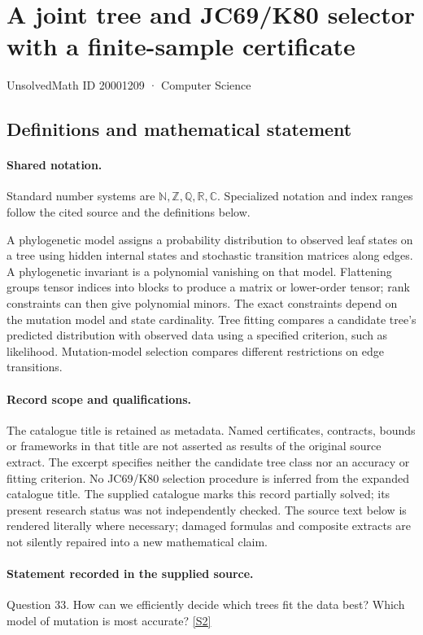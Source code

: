 \documentclass[11pt]{article}
\newcommand{\sref}[2]{\hyperlink{source:#1:#2}{[S#2]}}
\begin{document}
\setcounter{section}{20001208}
\section{A joint tree and JC69/K80 selector with a finite-sample certificate}\label{20001209}
{\small\sffamily UnsolvedMath ID 20001209 · Computer Science}
\subsection{Definitions and mathematical statement}

\paragraph{Shared notation.}Standard number systems are $\mathbb N,\mathbb Z,\mathbb Q,\mathbb R,\mathbb C$. Specialized notation and index ranges follow the cited source and the definitions below.


A phylogenetic model assigns a probability distribution to observed leaf states on a tree using hidden internal states and stochastic transition matrices along edges. A phylogenetic invariant is a polynomial vanishing on that model. Flattening groups tensor indices into blocks to produce a matrix or lower-order tensor; rank constraints can then give polynomial minors. The exact constraints depend on the mutation model and state cardinality. Tree fitting compares a candidate tree's predicted distribution with observed data using a specified criterion, such as likelihood. Mutation-model selection compares different restrictions on edge transitions.
\paragraph{Record scope and qualifications.}
The catalogue title is retained as metadata. Named certificates, contracts, bounds or frameworks in that title are not asserted as results of the original source extract.
The excerpt specifies neither the candidate tree class nor an accuracy or fitting criterion. No JC69/K80 selection procedure is inferred from the expanded catalogue title. The supplied catalogue marks this record partially solved; its present research status was not independently checked.
The source text below is rendered literally where necessary; damaged formulas and composite extracts are not silently repaired into a new mathematical claim.
\paragraph{Statement recorded in the supplied source.}
Question 33. How can we efficiently decide which trees fit the data best? Which model of mutation is most accurate? \sref{20001209}{2}
\end{document}
